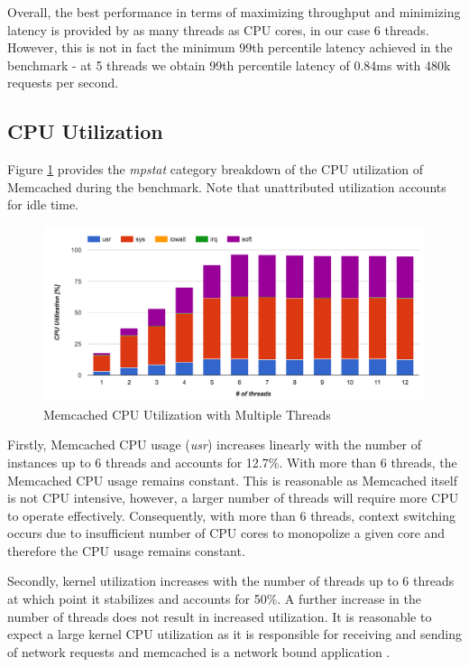 Overall, the best performance in terms of maximizing throughput and minimizing latency is provided by as many threads as CPU cores, in our case 6 threads. However, this is not in fact the minimum 99th percentile latency achieved in the benchmark - at 5 threads we obtain 99th percentile latency of 0.84ms with 480k requests per second.


\subsection{CPU Utilization}

Figure \ref{fig:m_threads_cpu} provides the \textit{mpstat} category breakdown of the CPU utilization of Memcached during the benchmark. Note that unattributed utilization accounts for idle time.

\begin{figure}[h]
    \includegraphics[width=\textwidth]{./res2/m_threads_cpu.png}
    \caption{Memcached CPU Utilization with Multiple Threads}
    \label{fig:m_threads_cpu}
\end{figure}

Firstly, Memcached CPU usage (\textit{usr}) increases linearly with the number of instances up to 6 threads and accounts for 12.7\%. With more than 6 threads, the Memcached CPU usage remains constant. This is reasonable as Memcached itself is not CPU intensive, however, a larger number of threads will require more CPU to operate effectively. Consequently, with more than 6 threads, context switching occurs due to insufficient number of CPU cores to monopolize a given core and therefore the CPU usage remains constant.

Secondly, kernel utilization increases with the number of threads up to 6 threads at which point it stabilizes and accounts for 50\%. A further increase in the number of threads does not result in increased utilization. It is reasonable to expect a large kernel CPU utilization as it is responsible for receiving and sending of network requests and memcached is a network bound application \cite{belay2014ix}.

